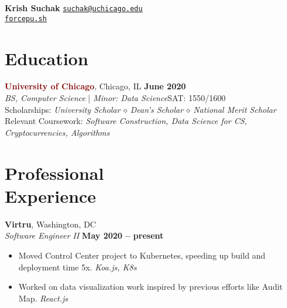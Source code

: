 \documentclass[margin]{resume}
\begin{document}
\hspace{-28mm}\textbf {\Large Krish Suchak}
\hfill \textcolor{blu}{\texttt{\href{mailto:suchak@uchicago.edu}{suchak@uchicago.edu}}}
\\ \phantom{invisible} \hfill \hspace{5mm} \textcolor{blu}{\texttt{\href{https://forcepu.sh}{forcepu.sh}}}
\vspace{4mm}

    \section{\mysidestyle Education}

    \textcolor{maroon}{\textbf{University of Chicago}}, Chicago, IL \hfill \textbf{June 2020} \vspace{2mm}\\\vspace{1mm}%
    \textsl{BS, Computer Science} | \textsl{Minor: Data Science}\hfill SAT: 1550/1600\\
Scholarships: \textit{University Scholar $\smwhtdiamond$ Dean’s Scholar $\smwhtdiamond$ National Merit Scholar}\\
Relevant Coursework: \textit{Software Construction, Data Science for CS, Cryptocurrencies, Algorithms}

    \section{\mysidestyle Professional\\Experience}

    
    \textcolor{blu}{\textbf{Virtru}}, Washington, DC \vspace{2mm}\\\vspace{1mm}%
   \textsl{Software Engineer II} \hfill \textbf{May 2020 -- present}

\begin{itemize}
\item Moved Control Center project to Kubernetes, speeding up build and deployment time 5x. \phantom{invisible} \hfill \textit{Koa.js, K8s}
\item Worked on data visualization work inspired by previous efforts like Audit Map. \hfill \textit{React.js}
\end{itemize}    
\end{document}
